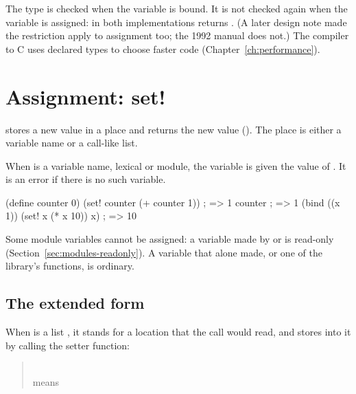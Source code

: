 \noindent The type is checked when the variable is bound. It is not checked
again when the variable is assigned: in both implementations  returns . (A later design note
made the restriction apply to assignment too; the 1992 manual does not.)
The compiler to C uses declared types to choose faster code
(Chapter~\ref{ch:performance}).

\section{Assignment: set!}\label{sec:control-assignment}

\begin{quote}
\end{quote}

\noindent {} stores a new value in a place and returns the new
value (). The place is either a variable name or a
call-like list.

When  is a variable name, lexical or module, the variable is
given the value of . It is an error if there is no such
variable.

\begin{dylan}
(define counter 0)
(set! counter (+ counter 1))   ; => 1
counter                        ; => 1
(bind ((x 1))
  (set! x (* x 10))
  x)                           ; => 10
\end{dylan}

\noindent Some module variables cannot be assigned: a variable made by
 or  is read-only
(Section~\ref{sec:modules-readonly}). A variable that 
alone made, or one of the library's functions, is ordinary.

\subsection{The extended form}\label{sec:control-extended-set}

When  is a list , it
stands for a location that the call 
would read, and  stores into it by calling the setter function:

\begin{quote}
\\
means\\
\end{quote}

